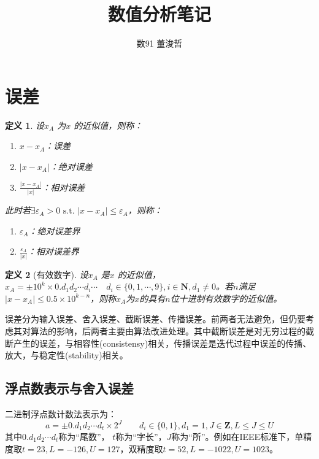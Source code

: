 \documentclass{ctexart}
\title{数值分析笔记}
\author{数91 董浚哲}
\begin{document}
\maketitle
\newcommand{\R}{\mathbf{R}}
\newcommand{\dd}{\,\mathrm{d}}
\newcommand{\st}{\text{ s.t. }}
\newcommand{\pp}[2]{\frac{\partial #1}{\partial #2}}
\newcommand{\fl}{\mathrm{fl}}


\newtheorem{Thm}{定理}[section]
\newtheorem{Lemma}[Thm]{引理}
\newtheorem{Prop}[Thm]{命题}
\newtheorem{Cor}[Thm]{推论}
\newtheorem{Def}{定义}[section]
\newtheorem{Rmk}{注}[section]
\newtheorem{Eg}{例}[section]
\newenvironment{solution}{\begin{proof}[Solution]}{\end{proof}}

\section{误差}
\begin{Def} 设$x_A$ 为$x$ 的近似值，则称：
\begin{enumerate}
\item$x-x_A$：误差
\item$|x-x_A|$：绝对误差
\item$\frac{|x-x_A|}{|x|}$：相对误差
\end{enumerate}
此时若$\exists \varepsilon_A>0\st |x-x_A|\leq \varepsilon_A$，则称：
\begin{enumerate}
\item $\varepsilon_A$：绝对误差界
\item $\frac{\varepsilon_A}{|x|}$：相对误差界
\end{enumerate}
\end{Def}

\begin{Def}[有效数字]
设$x_A$ 是$x$ 的近似值，$x_A=\pm10^k\times 0.d_1d_2\cdots d_i\cdots\quad d_i\in\{0,1,\cdots, 9\}, i\in \mathbf{N}, d_1\neq 0$。若$n$满足$|x-x_A|\leq 0.5\times 10^{k-n}$，则称$x_A$为$x$的具有$n$位十进制有效数字的近似值。
\end{Def}

误差分为输入误差、舍入误差、截断误差、传播误差。前两者无法避免，但仍要考虑其对算法的影响，后两者主要由算法改进处理。其中截断误差是对无穷过程的截断产生的误差，与相容性(consistensy)相关，传播误差是迭代过程中误差的传播、放大，与稳定性(stability)相关。

\subsection{浮点数表示与舍入误差}
二进制浮点数计数法表示为：
\[a=\pm 0.d_1d_2\cdots d_t\times 2^J\qquad d_i\in\{0,1\},d_1=1, J\in \mathbf{Z}, L\leq J\leq U\]
其中$0.d_1d_2\cdots d_t$称为“尾数”， $t$称为“字长”，$J$称为“所”。例如在IEEE标准下，单精度取$t=23,L=-126,U=127$，双精度取$t=52,L=-1022,U=1023$。
\end{document}
